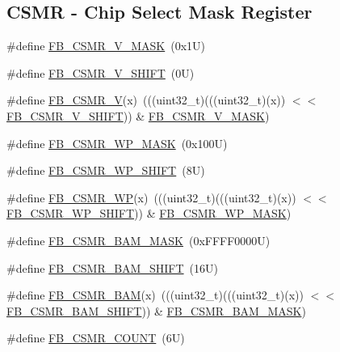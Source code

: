 \subsection*{C\+S\+MR -\/ Chip Select Mask Register}
\begin{DoxyCompactItemize}
\item 
\#define \mbox{\hyperlink{group___f_b___register___masks_ga746554e800a78e64f18c333f8b3dbd2c}{F\+B\+\_\+\+C\+S\+M\+R\+\_\+\+V\+\_\+\+M\+A\+SK}}~(0x1\+U)
\item 
\#define \mbox{\hyperlink{group___f_b___register___masks_ga62bde86e3e74e677b6cb555c806d1dc3}{F\+B\+\_\+\+C\+S\+M\+R\+\_\+\+V\+\_\+\+S\+H\+I\+FT}}~(0\+U)
\item 
\#define \mbox{\hyperlink{group___f_b___register___masks_gaa8113c48a7ae3cf63030cc2195f3f4d1}{F\+B\+\_\+\+C\+S\+M\+R\+\_\+V}}(x)~(((uint32\+\_\+t)(((uint32\+\_\+t)(x)) $<$$<$ \mbox{\hyperlink{group___f_b___register___masks_ga62bde86e3e74e677b6cb555c806d1dc3}{F\+B\+\_\+\+C\+S\+M\+R\+\_\+\+V\+\_\+\+S\+H\+I\+FT}})) \& \mbox{\hyperlink{group___f_b___register___masks_ga746554e800a78e64f18c333f8b3dbd2c}{F\+B\+\_\+\+C\+S\+M\+R\+\_\+\+V\+\_\+\+M\+A\+SK}})
\item 
\#define \mbox{\hyperlink{group___f_b___register___masks_ga40725292274706aa0a0c013201498f4b}{F\+B\+\_\+\+C\+S\+M\+R\+\_\+\+W\+P\+\_\+\+M\+A\+SK}}~(0x100\+U)
\item 
\#define \mbox{\hyperlink{group___f_b___register___masks_ga6d49da1d3aabbb8619673ac0fba95dd1}{F\+B\+\_\+\+C\+S\+M\+R\+\_\+\+W\+P\+\_\+\+S\+H\+I\+FT}}~(8\+U)
\item 
\#define \mbox{\hyperlink{group___f_b___register___masks_ga4b5ef11d1e22fa6d0f789f05e075b353}{F\+B\+\_\+\+C\+S\+M\+R\+\_\+\+WP}}(x)~(((uint32\+\_\+t)(((uint32\+\_\+t)(x)) $<$$<$ \mbox{\hyperlink{group___f_b___register___masks_ga6d49da1d3aabbb8619673ac0fba95dd1}{F\+B\+\_\+\+C\+S\+M\+R\+\_\+\+W\+P\+\_\+\+S\+H\+I\+FT}})) \& \mbox{\hyperlink{group___f_b___register___masks_ga40725292274706aa0a0c013201498f4b}{F\+B\+\_\+\+C\+S\+M\+R\+\_\+\+W\+P\+\_\+\+M\+A\+SK}})
\item 
\#define \mbox{\hyperlink{group___f_b___register___masks_ga9f7361c70716e7a39579b6418ae2c20c}{F\+B\+\_\+\+C\+S\+M\+R\+\_\+\+B\+A\+M\+\_\+\+M\+A\+SK}}~(0x\+F\+F\+F\+F0000\+U)
\item 
\#define \mbox{\hyperlink{group___f_b___register___masks_ga6a99aa1f2614f6287dfa8a83a2ceead4}{F\+B\+\_\+\+C\+S\+M\+R\+\_\+\+B\+A\+M\+\_\+\+S\+H\+I\+FT}}~(16\+U)
\item 
\#define \mbox{\hyperlink{group___f_b___register___masks_ga2ef6f66f3c2595772b2fc4e841fc834e}{F\+B\+\_\+\+C\+S\+M\+R\+\_\+\+B\+AM}}(x)~(((uint32\+\_\+t)(((uint32\+\_\+t)(x)) $<$$<$ \mbox{\hyperlink{group___f_b___register___masks_ga6a99aa1f2614f6287dfa8a83a2ceead4}{F\+B\+\_\+\+C\+S\+M\+R\+\_\+\+B\+A\+M\+\_\+\+S\+H\+I\+FT}})) \& \mbox{\hyperlink{group___f_b___register___masks_ga9f7361c70716e7a39579b6418ae2c20c}{F\+B\+\_\+\+C\+S\+M\+R\+\_\+\+B\+A\+M\+\_\+\+M\+A\+SK}})
\item 
\#define \mbox{\hyperlink{group___f_b___register___masks_ga861785aecc93d0e0824eb96ecc78322f}{F\+B\+\_\+\+C\+S\+M\+R\+\_\+\+C\+O\+U\+NT}}~(6\+U)
\end{DoxyCompactItemize}
